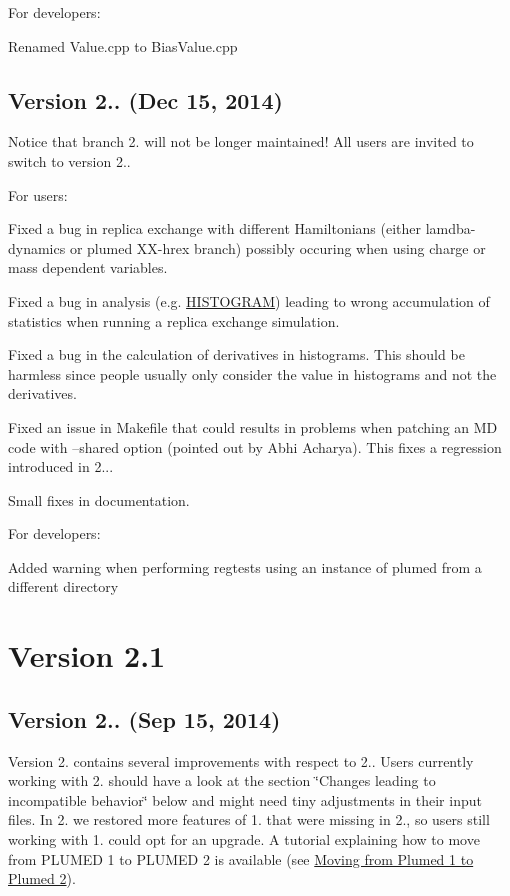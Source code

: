 For developers\+:
\begin{DoxyItemize}
\item Renamed Value.\+cpp to Bias\+Value.\+cpp
\end{DoxyItemize}

\subsection*{Version 2.. (Dec 15, 2014) }

Notice that branch 2. will not be longer maintained! All users are invited to switch to version 2..

For users\+:
\begin{DoxyItemize}
\item Fixed a bug in replica exchange with different Hamiltonians (either lamdba-\/dynamics or plumed X\+X-\/hrex branch) possibly occuring when using charge or mass dependent variables.
\item Fixed a bug in analysis (e.\+g. \hyperlink{HISTOGRAM}{H\+I\+S\+T\+O\+G\+R\+A\+M}) leading to wrong accumulation of statistics when running a replica exchange simulation.
\item Fixed a bug in the calculation of derivatives in histograms. This should be harmless since people usually only consider the value in histograms and not the derivatives.
\item Fixed an issue in Makefile that could results in problems when patching an M\+D code with --shared option (pointed out by Abhi Acharya). This fixes a regression introduced in 2...
\item Small fixes in documentation.
\end{DoxyItemize}

For developers\+:
\begin{DoxyItemize}
\item Added warning when performing regtests using an instance of plumed from a different directory 
\end{DoxyItemize}\hypertarget{CHANGES-2-1}{}\section{Version 2.1}\label{CHANGES-2-1}
\subsection*{Version 2.. (Sep 15, 2014) }

Version 2. contains several improvements with respect to 2.. Users currently working with 2. should have a look at the section \char`\"{}\+Changes leading to incompatible behavior\char`\"{} below and might need tiny adjustments in their input files. In 2. we restored more features of 1. that were missing in 2., so users still working with 1. could opt for an upgrade. A tutorial explaining how to move from P\+L\+U\+M\+E\+D 1 to P\+L\+U\+M\+E\+D 2 is available (see \hyperlink{moving}{Moving from Plumed 1 to Plumed 2}).


